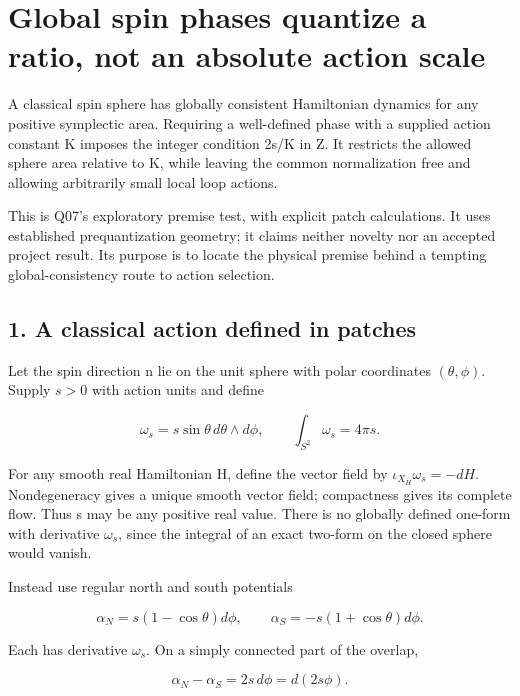 \documentclass[11pt,a4paper]{article}
\begin{document}
\hypertarget{global-spin-phases-quantize-a-ratio-not-an-absolute-action-scale}{%
\section{Global spin phases quantize a ratio, not an absolute action
scale}\label{global-spin-phases-quantize-a-ratio-not-an-absolute-action-scale}}

A classical spin sphere has globally consistent Hamiltonian dynamics for
any positive symplectic area. Requiring a well-defined phase with a
supplied action constant K imposes the integer condition 2s/K in Z. It
restricts the allowed sphere area relative to K, while leaving the
common normalization free and allowing arbitrarily small local loop
actions.

This is Q07's exploratory premise test, with explicit patch
calculations. It uses established prequantization geometry; it claims
neither novelty nor an accepted project result. Its purpose is to locate
the physical premise behind a tempting global-consistency route to
action selection.

\hypertarget{a-classical-action-defined-in-patches}{%
\subsection{1. A classical action defined in
patches}\label{a-classical-action-defined-in-patches}}

Let the spin direction n lie on the unit sphere with polar coordinates
\((\theta,\phi)\). Supply \(s>0\) with action units and define

\[\omega_s=s\sin\theta\,d\theta\wedge d\phi,
\qquad \int_{S^2}\omega_s=4\pi s. \tag{1}\]

For any smooth real Hamiltonian H, define the vector field by
\(\iota_{X_H}\omega_s=-dH\). Nondegeneracy gives a unique smooth vector
field; compactness gives its complete flow. Thus s may be any positive
real value. There is no globally defined one-form with derivative
\(\omega_s\), since the integral of an exact two-form on the closed
sphere would vanish.

Instead use regular north and south potentials

\[\alpha_N=s(1-\cos\theta)d\phi,\qquad
\alpha_S=-s(1+\cos\theta)d\phi. \tag{2}\]

Each has derivative \(\omega_s\). On a simply connected part of the
overlap,

\[\alpha_N-\alpha_S=2s\,d\phi=d(2s\phi). \tag{3}\]
\end{document}
